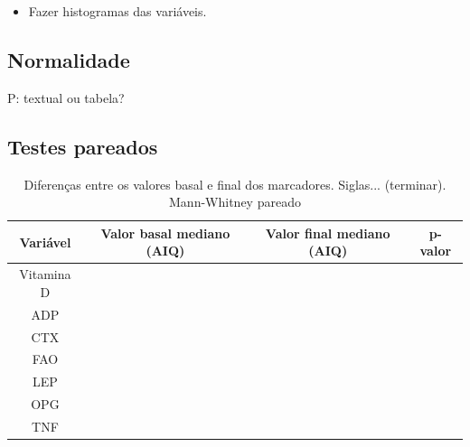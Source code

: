 \documentclass[a4paper]{article}
\begin{document}
\begin{itemize}
\item Fazer histogramas das variáveis.
\end{itemize}

\newpage
\subsection{Normalidade}

P: textual ou tabela?

\newpage
\subsection{Testes pareados}
\label{sec:pareados}

\begin{table}[!h]
  \centering
  \begin{tabular}{c|cc|c}
    \hline
    Variável&Valor basal mediano (AIQ) &Valor final mediano (AIQ) &p-valor\\
    \hline
    \hline
    Vitamina D&&&\\
\hline
    ADP&&&\\
    CTX&&&\\
    FAO&&&\\
    LEP&&&\\
    OPG&&&\\
    TNF&&&\\
    \hline
  \end{tabular}
  \caption[Diferenças entre os valores basal e final dos marcadores]{Diferenças entre os valores basal e final dos marcadores. Siglas... (terminar). Mann-Whitney pareado}
  \label{tab:testes-pareados}
\end{table}
\end{document}

